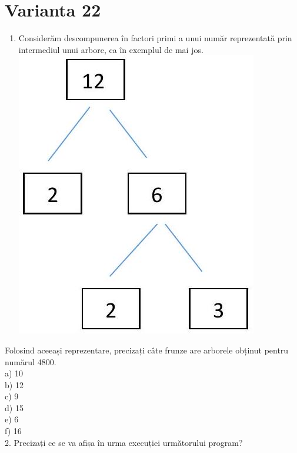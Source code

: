 \documentclass[10pt]{article}
\begin{document}
\section*{Varianta 22}
\begin{enumerate}
  \item Considerăm descompunerea în factori primi a unui număr reprezentată prin intermediul unui arbore, ca în exemplul de mai jos.\\
\includegraphics[max width=\textwidth, center]{2025_04_17_46e04c6acd873ea9558dg-119}
\end{enumerate}

Folosind aceeași reprezentare, precizați câte frunze are arborele obținut pentru numărul 4800.\\
a) 10\\
b) 12\\
c) 9\\
d) 15\\
e) 6\\
f) 16\\
2. Precizați ce se va afișa în urma execuției următorului program?
\end{document}

